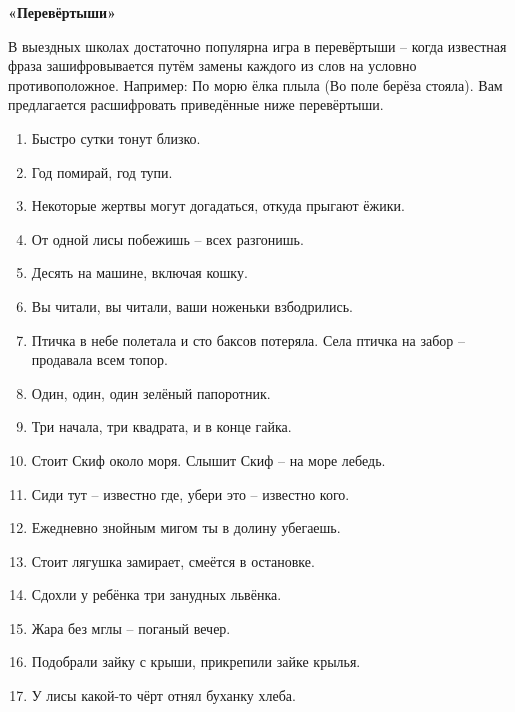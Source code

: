 \begin{center}
    \textbf{«Перевёртыши»}
\end{center}
В выездных школах достаточно популярна игра в перевёртыши – когда известная фраза зашифровывается путём замены каждого из слов на условно противоположное. Например: По морю ёлка плыла (Во поле берёза стояла). Вам предлагается расшифровать приведённые ниже перевёртыши.
\begin{enumerate}
    \item Быстро сутки тонут близко. 
    \item Год помирай, год тупи.
    \item Некоторые жертвы могут догадаться, откуда прыгают ёжики.
    \item От одной лисы побежишь – всех разгонишь. 
    \item Десять на машине, включая кошку.
    \item Вы читали, вы читали, ваши ноженьки взбодрились.
    \item Птичка в небе полетала и сто баксов потеряла. Села птичка на забор – продавала всем топор.
    \item Один, один, один зелёный папоротник. 
    \item Три начала, три квадрата, и в конце гайка.
    \item Стоит Скиф около моря. Слышит Скиф – на море лебедь.
    \item Сиди тут – известно где, убери это – известно кого.
    \item Ежедневно знойным мигом ты в долину убегаешь.
    \item Стоит лягушка замирает, смеётся в остановке.
    \item Сдохли у ребёнка три занудных львёнка.
    \item Жара без мглы – поганый вечер.
    \item Подобрали зайку с крыши, прикрепили зайке крылья.
    \item У лисы какой-то чёрт отнял буханку хлеба.
\end{enumerate}